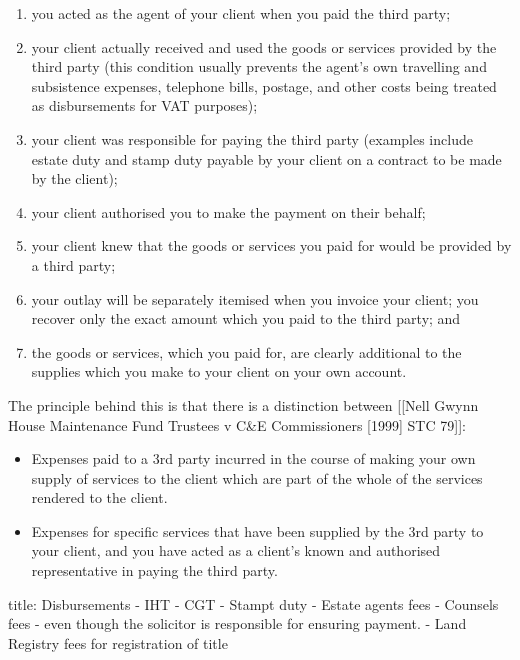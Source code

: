 \documentclass[
]{article}
\newenvironment{Shaded}{}{}
\newcommand{\NormalTok}[1]{#1}
\providecommand{\tightlist}{%
  \setlength{\itemsep}{0pt}\setlength{\parskip}{0pt}}
\begin{document}
\begin{enumerate}
\def\labelenumi{\arabic{enumi}.}
\tightlist
\item
  you acted as the agent of your client when you paid the third party;
\item
  your client actually received and used the goods or services provided
  by the third party (this condition usually prevents the agent's own
  travelling and subsistence expenses, telephone bills, postage, and
  other costs being treated as disbursements for VAT purposes);
\item
  your client was responsible for paying the third party (examples
  include estate duty and stamp duty payable by your client on a
  contract to be made by the client);
\item
  your client authorised you to make the payment on their behalf;
\item
  your client knew that the goods or services you paid for would be
  provided by a third party;
\item
  your outlay will be separately itemised when you invoice your client;
  you recover only the exact amount which you paid to the third party;
  and
\item
  the goods or services, which you paid for, are clearly additional to
  the supplies which you make to your client on your own account.
\end{enumerate}

The principle behind this is that there is a distinction between
{[}{[}Nell Gwynn House Maintenance Fund Trustees v C\&E Commissioners
{[}1999{]} STC 79{]}{]}:

\begin{itemize}
\tightlist
\item
  Expenses paid to a 3rd party incurred in the course of making your own
  supply of services to the client which are part of the whole of the
  services rendered to the client.
\item
  Expenses for specific services that have been supplied by the 3rd
  party to your client, and you have acted as a client's known and
  authorised representative in paying the third party.
\end{itemize}

\begin{Shaded}
\begin{Highlighting}[]
\NormalTok{title: Disbursements}
\NormalTok{{-} IHT}
\NormalTok{{-} CGT}
\NormalTok{{-} Stampt duty}
\NormalTok{{-} Estate agents\textquotesingle{} fees}
\NormalTok{{-} Counsel\textquotesingle{}s fees {-} even though the solicitor is responsible for ensuring payment. }
\NormalTok{{-} Land Registry fees for registration of title}
\end{Highlighting}
\end{Shaded}
\end{document}
